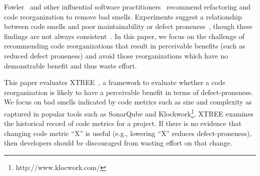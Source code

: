 \documentclass[twocolumn,5p]{elsarticle}
\newcommand{\bi}{\begin{itemize}[leftmargin=0.4cm]}
\newcommand{\ei}{\end{itemize}}
\theoremstyle{break}
\begin{document}
	Fowler~\cite{fowler99} and other influential software practitioners~\cite{mcconnell2004code,horror} recommend refactoring and code reorganization to remove bad smells. Experiments suggest a relationship between code smells and poor maintainability or defect proneness~\cite{yamashita2013code,yama13,zazworka2011investigating}, though these findings are not always consistent~\cite{olbrich2010all}. In this paper, we focus on the challenge of recommending code reorganizations that result in perceivable benefits (such as reduced defect proneness) and avoid those reorganizations which have no demonstrable benefit and thus waste effort.
	
	
	
	
	
	
	
	
	This paper evaluates XTREE~\cite{krishna2015actionable}, a framework to evaluate whether a code reorganization is likely to have a perceivable benefit in terms of defect-proneness. We focus on bad smells indicated by code metrics such as size and complexity as captured in popular tools such as SonarQube and Klockwork\footnote{http://www.klocwork.com/}. 
		XTREE examines the historical record of code metrics for a project. If there is no evidence that changing code metric ``X'' is useful (e.g., lowering ``X'' reduces defect-proneness), then developers should be discouraged from wasting effort on that change.
	
\end{document}
